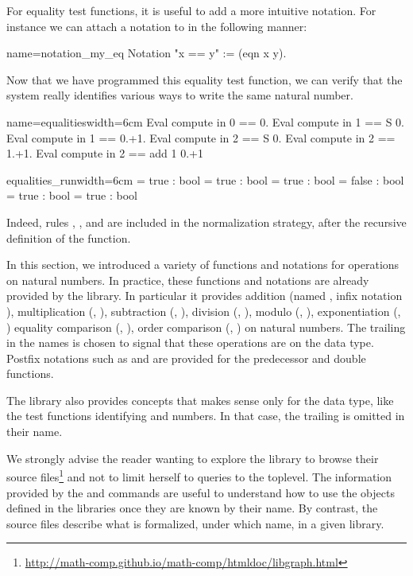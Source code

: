 For equality test functions, it is useful to add a more intuitive
notation.  For instance we can attach a notation to  in
the following manner:

\begin{coq}{name=notation_my_eq}{}
Notation "x == y" := (eqn x y).
\end{coq}
Now
that we have programmed this equality test function, we can verify
that the \Coq{} system really identifies various ways to write the same
natural number.

\begin{coq}{name=equalities}{width=6cm}
Eval compute in 0 == 0.
Eval compute in 1 == S 0.
Eval compute in 1 == 0.+1.
Eval compute in 2 == S 0.
Eval compute in 2 == 1.+1.
Eval compute in 2 == add 1 0.+1
\end{coq}
\begin{coqout}{equalities_run}{width=6cm}
= true : bool
= true : bool
= true : bool
= false : bool
= true : bool
= true : bool
\end{coqout}

Indeed, rules ,
,
 and
 are included in the 
normalization strategy, after the recursive definition of the 
function.


In this section, we introduced a variety of functions and notations
for operations on natural numbers.  In practice, these functions and
notations are already provided by the \mcbMC{} library.  In particular
it provides addition (named , infix notation \C{+}),
multiplication
(, \C{*}), subtraction (, \C{-}), division (,
\C{\%/}),  modulo (, \C{\%\%}), exponentiation (, \C{\^})
equality comparison (, \C{==}), order
comparison (, \C{<=}) on natural numbers.  The trailing  in
the names is chosen to signal that these operations are on the  data
type.  Postfix notations such as  and  are provided for
the predecessor and double functions.

The \mcbMC{} library also provides concepts that makes sense only
for the  data type, like the
test functions identifying  and  numbers. In that
case, the trailing  is omitted in their name.

We strongly advise the reader wanting to explore the \mcbMC{} library
to browse their source
files\footnote{\url{http://math-comp.github.io/math-comp/htmldoc/libgraph.html}}
and not to limit herself to queries to the toplevel. The
information provided by the  and  commands are
useful to understand how to use the objects defined in the libraries
once they are known by their name. By contrast, the source
files describe what is formalized, under which name, in a given library.


